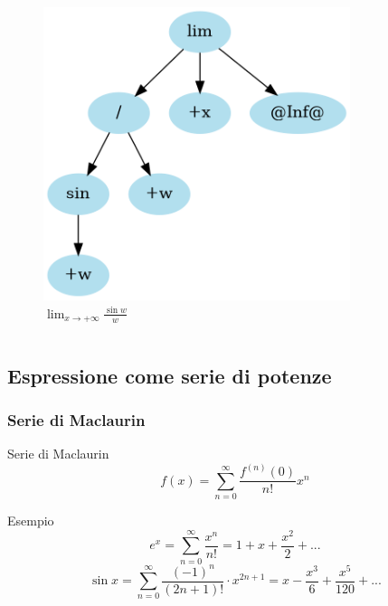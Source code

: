 \documentclass[aspectratio=149]{beamer}
\begin{document}
\begin{frame}
\begin{columns}
\begin{column}{0.45\textwidth}
\begin{figure}
					\includegraphics[width=0.8\textwidth]{pres_img/replaced2.png}
					\caption{\(\lim_{x \to +\infty}{\frac{\sin{w}}{w}}\)}
				\end{figure}
			\end{column}
		\end{columns}
	\end{frame}

	\subsection{Espressione come serie di potenze}
	
	\begin{frame}
		\frametitle{Serie di Maclaurin}
		\begin{block}{Serie di Maclaurin}
			\[
			f(x) = \sum_{n=0}^{\infty}{\frac{f^{(n)}(0)}{n!} x^{n}}
			\] 
		\end{block}
		\begin{exampleblock}{Esempio}
			\[
				e^{x} = \sum_{n=0}^{\infty} \frac{x^{n}}{n!} = 1 + x + \frac{x^2}{2} + ...
			\]
			\[
				\sin{x} = \sum_{n=0}^{\infty} \frac{(-1)^{n}}{(2n + 1)!} \cdot x^{2n+1} = x - \frac{x^3}{6} + \frac{x^5}{120} + ...
			\]
		\end{exampleblock}
	\end{frame}
\end{document}
